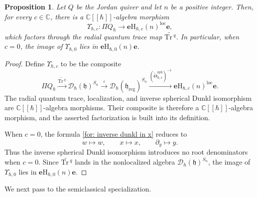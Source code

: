 \documentclass[11pt,reqno]{amsart}
\newtheorem{proposition}[theorem]{Proposition}
\theoremstyle{definition}
\newcommand{\bbC}{\mathbb{C}}
\newcommand{\be}{\mathbf{e}}
\newcommand{\tos}{\mapsto}
\newcommand{\Tr}{\mathrm{Tr} \,}
\newcommand{\mD}{\mathcal{D}}
\newcommand{\rmH}{\mathrm{H}}
\newcommand{\fkh}{\mathfrak{h}}
\newcommand{\reg}{\mathrm{reg}}
\newcommand{\sph}{{\mathrm{sph}}}
\newcommand{\loc}{{\mathrm{loc}}}
\begin{document}
\begin{proposition}
	\label{prop: quant preproj to RCA}
	Let \(Q\) be the Jordan quiver and let \(n\) be a positive integer. Then, for every \(c\in\bbC\), there is a \(\bbC[[\hbar]]\)-algebra morphism
	\[
	\Upsilon_{\hbar,c}:
	\Pi Q_{\hbar}
	\longrightarrow
	\be\rmH_{\hbar,c}(n)^\loc\be,
	\]
	which factors through the radial quantum trace map \(\widetilde{\Tr^q}\).
	In particular, when \(c=0\), the image of \(\Upsilon_{\hbar,0}\) lies in \(\be\rmH_{\hbar,0}(n)\be\).
\end{proposition}

\begin{proof}
	Define \(\Upsilon_{\hbar,c}\) to be the composite
	\[
	\Pi Q_{\hbar}
	\xrightarrow{\widetilde{\Tr^q}}
	\mD_\hbar(\fkh)^{S_n}
	\xrightarrow{\iota}
	\mD_\hbar(\fkh_{\reg})^{S_n}
	\xrightarrow{(\widetilde{\Theta}_{\hbar,c}^{\sph})^{-1}}
	\be\rmH_{\hbar,c}(n)^\loc\be.
	\]
	The radial quantum trace, localization, and inverse  spherical Dunkl isomorphism are \(\bbC[[\hbar]]\)-algebra morphisms. Their composite is therefore a \(\bbC[[\hbar]]\)-algebra morphism, and the asserted factorization is built into its definition.
	
	When \(c=0\), the formula \eqref{for: inverse dunkl in x} reduces to
	\[
	w\tos w,
	\qquad
	x\tos x,
	\qquad
	\partial_y\tos y.
	\]
	Thus the inverse spherical Dunkl isomorphism introduces no root denominators when \(c=0\). Since \(\widetilde{\Tr^q}\) lands in the nonlocalized algebra \(\mD_\hbar(\fkh)^{S_n}\), the image of \(\Upsilon_{\hbar,0}\) lies in \(\be\rmH_{\hbar,0}(n)\be\).
\end{proof}

We next pass to the semiclassical specialization.
\end{document}
